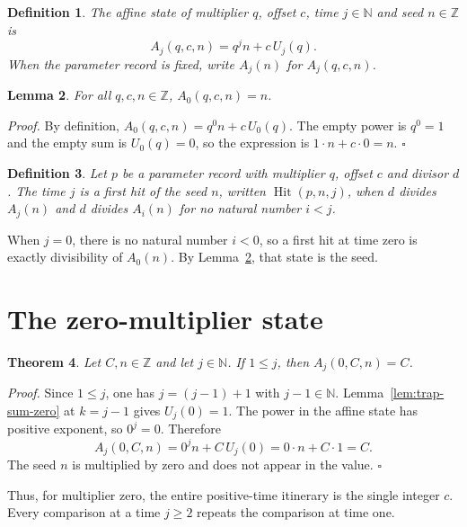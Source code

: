 \documentclass[11pt,letterpaper]{article}
\newcommand{\N}{\mathbb{N}}
\newcommand{\Z}{\mathbb{Z}}
\newtheorem{theorem}{Theorem}
\newtheorem{lemma}[theorem]{Lemma}
\newtheorem{definition}[theorem]{Definition}
\newenvironment{proof}{\noindent\textit{Proof.}}{\hfill\(\square\)}
\begin{document}
\begin{definition}
\label{def:affine-state}
The affine state of multiplier \(q\), offset \(c\), time \(j\in\N\) and seed \(n\in\Z\) is
\[
A_j(q,c,n)=q^j n+c\,U_j(q).
\]
When the parameter record is fixed, write \(A_j(n)\) for \(A_j(q,c,n)\).
\end{definition}

\begin{lemma}
\label{lem:affine-at-zero}
For all \(q,c,n\in\Z\), \(A_0(q,c,n)=n\).
\end{lemma}

\begin{proof}
By definition, \(A_0(q,c,n)=q^0 n+c\,U_0(q)\). The empty power is \(q^0=1\) and the empty sum is \(U_0(q)=0\), so the expression is \(1\cdot n+c\cdot 0=n\).
\end{proof}

\begin{definition}
\label{def:first-hit}
Let \(p\) be a parameter record with multiplier \(q\), offset \(c\) and divisor \(d\). The time \(j\) is a first hit of the seed \(n\), written \(\operatorname{Hit}(p,n,j)\), when \(d\) divides \(A_j(n)\) and \(d\) divides \(A_i(n)\) for no natural number \(i<j\).
\end{definition}

When \(j=0\), there is no natural number \(i<0\), so a first hit at time zero is exactly divisibility of \(A_0(n)\). By Lemma~\ref{lem:affine-at-zero}, that state is the seed.

\section{The zero-multiplier state}

\begin{theorem}
\label{thm:zero-affine}
Let \(C,n\in\Z\) and let \(j\in\N\). If \(1\le j\), then \(A_j(0,C,n)=C\).
\end{theorem}

\begin{proof}
Since \(1\le j\), one has \(j=(j-1)+1\) with \(j-1\in\N\). Lemma~\ref{lem:trap-sum-zero} at \(k=j-1\) gives \(U_j(0)=1\). The power in the affine state has positive exponent, so \(0^j=0\). Therefore
\[
A_j(0,C,n)=0^j n+C\,U_j(0)=0\cdot n+C\cdot 1=C.
\]
The seed \(n\) is multiplied by zero and does not appear in the value.
\end{proof}

Thus, for multiplier zero, the entire positive-time itinerary is the single integer \(c\). Every comparison at a time \(j\ge 2\) repeats the comparison at time one.
\end{document}
